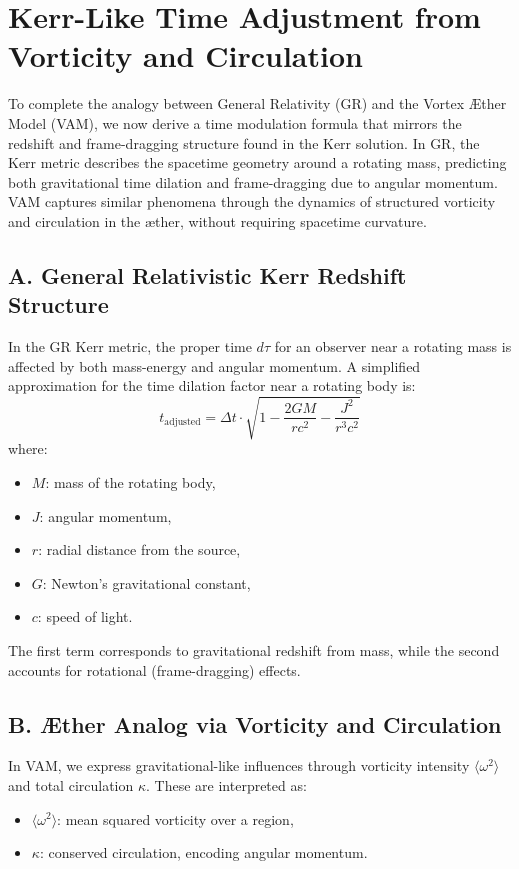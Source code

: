 \section{Kerr-Like Time Adjustment from Vorticity and Circulation}

To complete the analogy between General Relativity (GR) and the Vortex Æther Model (VAM), we now derive a time modulation formula that mirrors the redshift and frame-dragging structure found in the Kerr solution. In GR, the Kerr metric describes the spacetime geometry around a rotating mass, predicting both gravitational time dilation and frame-dragging due to angular momentum. VAM captures similar phenomena through the dynamics of structured vorticity and circulation in the æther, without requiring spacetime curvature.

\subsection*{A. General Relativistic Kerr Redshift Structure}

In the GR Kerr metric, the proper time $d\tau$ for an observer near a rotating mass is affected by both mass-energy and angular momentum. A simplified approximation for the time dilation factor near a rotating body is:
\begin{equation}
    t_{\text{adjusted}} = \Delta t \cdot \sqrt{1 - \frac{2GM}{rc^2} - \frac{J^2}{r^3c^2}}
    \tag{22}
\end{equation}
where:
\begin{itemize}
    \item $M$: mass of the rotating body,
    \item $J$: angular momentum,
    \item $r$: radial distance from the source,
    \item $G$: Newton’s gravitational constant,
    \item $c$: speed of light.
\end{itemize}

The first term corresponds to gravitational redshift from mass, while the second accounts for rotational (frame-dragging) effects.

\subsection*{B. Æther Analog via Vorticity and Circulation}

In VAM, we express gravitational-like influences through vorticity intensity $\langle \omega^2 \rangle$ and total circulation $\kappa$. These are interpreted as:
\begin{itemize}
    \item $\langle \omega^2 \rangle$: mean squared vorticity over a region,
    \item $\kappa$: conserved circulation, encoding angular momentum.
\end{itemize}


